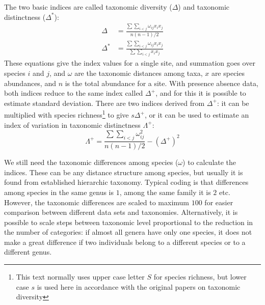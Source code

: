 \documentclass[a4paper,10pt]{amsart}
\begin{document}
The two basic indices are called taxonomic diversity ($\Delta$) and
taxonomic distinctness ($\Delta^*$):
\begin{align}
  \Delta &= \frac{\sum \sum_{i<j} \omega_{ij} x_i x_j}{n (n-1) / 2}\\
\Delta^* &= \frac{\sum \sum_{i<j} \omega_{ij} x_i x_j}{\sum \sum_{i<j} x_i x_j}
\end{align}
These equations give the index values for a single site, and summation
goes over species $i$ and $j$, and $\omega$ are the taxonomic
distances among taxa, $x$ are species abundances, and $n$ is the total
abundance for a site.  With presence absence data, both indices
reduce to the same index called $\Delta^+$, and for this it is
possible to estimate standard deviation. There are two indices
derived from $\Delta^+$: it can be multiplied with species
richness\footnote{This text normally uses upper case letter $S$ for
  species richness, but lower case $s$ is used here in accordance with
  the original papers on taxonomic diversity}
to give $s \Delta^+$, or it can be used to estimate an index of
variation in taxonomic distinctness $\Lambda^+$:
\begin{equation}
  \Lambda^+ = \frac{\sum \sum_{i<j} \omega_{ij}^2}{n (n-1) / 2} - (\Delta^+)^2
\end{equation}

We still need the taxonomic differences among species ($\omega$) to
calculate the indices. These can be any
distance structure among species, but usually it is found from
established hierarchic taxonomy. Typical coding is that differences
among species in the same genus is $1$, among the same family it is
$2$ etc. However, the taxonomic differences are scaled to maximum
$100$ for easier comparison between different data sets and
taxonomies. Alternatively, it is possible to scale steps between
taxonomic level proportional to the reduction in the number of
categories: if almost all genera have only one species, it does not
make a great difference if two individuals belong to a different
species or to a different genus.
\end{document}
